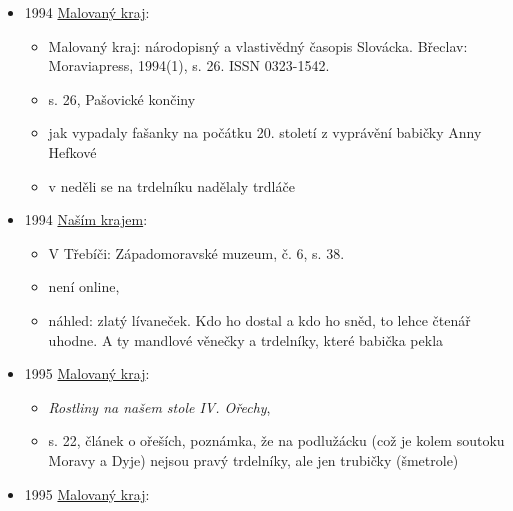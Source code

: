 \begin{itemize}
  \begin{itemize}
  \tightlist
  \item
    klub lidové tvořivosti na Praze 5, členky připravily na setkání
    tradiční pečivo, mimojiný trdelníky
  \end{itemize}
\item
  1994
  \href{https://ceskadigitalniknihovna.cz/uuid/uuid:1e8fe7c0-21a7-11e4-a8ab-001018b5eb5c}{Malovaný
  kraj}:

  \begin{itemize}
  \tightlist
  \item
    Malovaný kraj: národopisný a vlastivědný časopis Slovácka. Břeclav:
    Moraviapress, 1994(1), s. 26. ISSN 0323-1542.
  \item
    s. 26, Pašovické končiny
  \item
    jak vypadaly fašanky na počátku 20. století z vyprávění babičky Anny
    Hefkové
  \item
    v neděli se na trdelníku nadělaly trdláče
  \end{itemize}
\item
  1994
  \href{https://www.digitalniknihovna.cz/kkvhb/uuid/uuid:778eccc1-93ed-4085-9d43-f34c47ad1ea5}{Naším
  krajem}:

  \begin{itemize}
  \tightlist
  \item
    V Třebíči: Západomoravské muzeum, č. 6, s. 38.
  \item
    není online, 
  \item
    náhled: zlatý lívaneček. Kdo ho dostal a kdo ho sněd, to lehce
    čtenář uhodne. A ty mandlové věnečky a trdelníky, které babička
    pekla
  \end{itemize}
\item
  1995
  \href{https://ceskadigitalniknihovna.cz/uuid/uuid:464cbdb0-4060-11e4-8f33-5ef3fc9ae867}{Malovaný
  kraj}:

  \begin{itemize}
  \tightlist
  \item
    \emph{Rostliny na našem stole IV. Ořechy},
  \item
    s. 22, článek o ořeších, poznámka, že na podlužácku (což je kolem
    soutoku Moravy a Dyje) nejsou pravý trdelníky, ale jen trubičky
    (šmetrole)
  \end{itemize}
\item
  1995
  \href{https://ceskadigitalniknihovna.cz/uuid/uuid:0f104c60-3fbe-11e4-b6b9-001018b5eb5c}{Malovaný
  kraj}:


\end{itemize}
